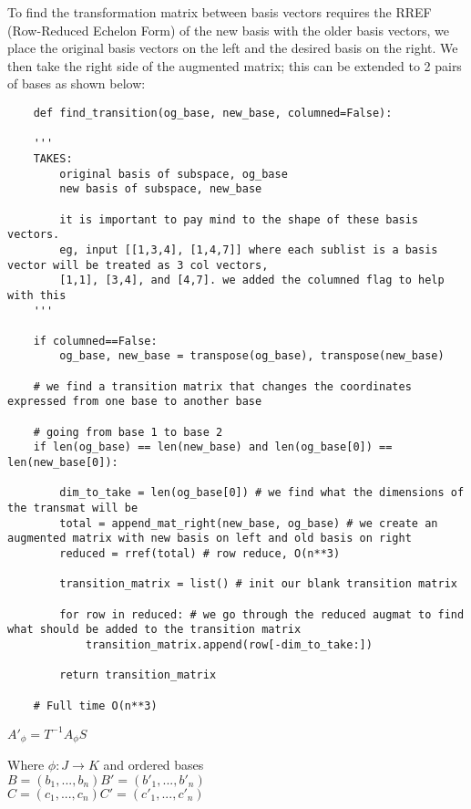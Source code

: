 \documentclass[12pt, a4paper]{article}
\begin{document}
To find the transformation matrix between basis vectors requires the RREF (Row-Reduced Echelon Form) of the new basis with the older basis vectors, we place the original basis vectors on the left and the desired basis on the right. 
We then take the right side of the augmented matrix; this can be extended to 2 pairs of bases as shown below:
\begin{lstlisting}
    def find_transition(og_base, new_base, columned=False):

    '''
    TAKES:
        original basis of subspace, og_base
        new basis of subspace, new_base

        it is important to pay mind to the shape of these basis vectors. 
        eg, input [[1,3,4], [1,4,7]] where each sublist is a basis vector will be treated as 3 col vectors, 
        [1,1], [3,4], and [4,7]. we added the columned flag to help with this
    '''

    if columned==False:
        og_base, new_base = transpose(og_base), transpose(new_base)

    # we find a transition matrix that changes the coordinates expressed from one base to another base

    # going from base 1 to base 2
    if len(og_base) == len(new_base) and len(og_base[0]) == len(new_base[0]):

        dim_to_take = len(og_base[0]) # we find what the dimensions of the transmat will be
        total = append_mat_right(new_base, og_base) # we create an augmented matrix with new basis on left and old basis on right
        reduced = rref(total) # row reduce, O(n**3)

        transition_matrix = list() # init our blank transition matrix

        for row in reduced: # we go through the reduced augmat to find what should be added to the transition matrix
            transition_matrix.append(row[-dim_to_take:])

        return transition_matrix
    
    # Full time O(n**3)
\end{lstlisting}
$ A'_{\phi} = T^{-1}A_{\phi}S $

Where $\phi : J \rightarrow K$ and ordered bases \\ 
$ B = (b_{1},...,b_{n})  B' = (b'_{1},...,b'_{n}) $
\\
$ C = (c_{1},...,c_{n})  C' = (c'_{1},...,c'_{n}) $
\end{document}
